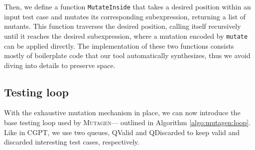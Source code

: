 \documentclass[sigconf,review,anonymous]{acmart}
\newcommand{\mutagen}{\textsc{Mutagen}\xspace}
\begin{document}
\noindent Then, we define a function \texttt{MutateInside} that takes a desired
position within an input test case and mutates its corresponding subexpression,
returning a list of mutants.
%
%
%
%
This function traverses the desired position, calling itself recursively until
it reaches the desired subexpression, where a mutation encoded by
\texttt{mutate} can be applied directly.
%
The implementation of these two functions consists mostly of boilerplate code
that our tool automatically synthesizes, thus we avoid diving into details to
preserve space.    


%


\subsection{Testing loop}

With the exhaustive mutation mechanism in place, we can now introduce the base
testing loop used by \mutagen --- outlined in Algorithm \ref{algo:mutagen:loop}.
%
Like in CGPT, we use two queues, QValid and QDiscarded to keep valid and
discarded interesting test cases, respectively.
%


\begin{algorithm}[t]
  \SetAlgoLined
  \DontPrintSemicolon
\caption{\label{algo:mutagen:loop}\mutagen Testing Loop}
\end{algorithm}
\end{document}
